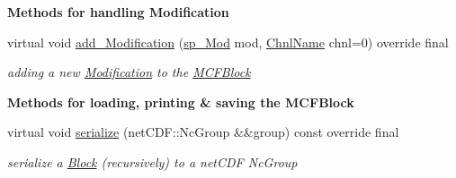 \begin{Indent}\textbf{ Methods for handling Modification}\par
\begin{DoxyCompactItemize}
\item 
virtual void \mbox{\hyperlink{class_s_m_spp__di__unipi__it_1_1_m_c_f_block_a2d7dffba0c9fd17de24549e0f1a4c760}{add\+\_\+\+Modification}} (\mbox{\hyperlink{group___modification___t_y_p_e_s_ga9024cf2ead61a1280d29771b063b1a62}{sp\+\_\+\+Mod}} mod, \mbox{\hyperlink{class_s_m_spp__di__unipi__it_1_1_observer_a54ce8db639626e45b1f20c289baa989b}{Chnl\+Name}} chnl=0) override final
\begin{DoxyCompactList}\small\item\em adding a new \mbox{\hyperlink{class_s_m_spp__di__unipi__it_1_1_modification}{Modification}} to the \mbox{\hyperlink{class_s_m_spp__di__unipi__it_1_1_m_c_f_block}{M\+C\+F\+Block}} \end{DoxyCompactList}\end{DoxyCompactItemize}
\end{Indent}
\begin{Indent}\textbf{ Methods for loading, printing \& saving the M\+C\+F\+Block}\par
\begin{DoxyCompactItemize}
\item 
virtual void \mbox{\hyperlink{class_s_m_spp__di__unipi__it_1_1_m_c_f_block_a1b39d46ae5259d58a1a1ed05af6c344d}{serialize}} (net\+C\+D\+F\+::\+Nc\+Group \&\&group) const override final
\begin{DoxyCompactList}\small\item\em serialize a \mbox{\hyperlink{class_s_m_spp__di__unipi__it_1_1_block}{Block}} (recursively) to a net\+C\+DF Nc\+Group \end{DoxyCompactList}\end{DoxyCompactItemize}
\end{Indent}

